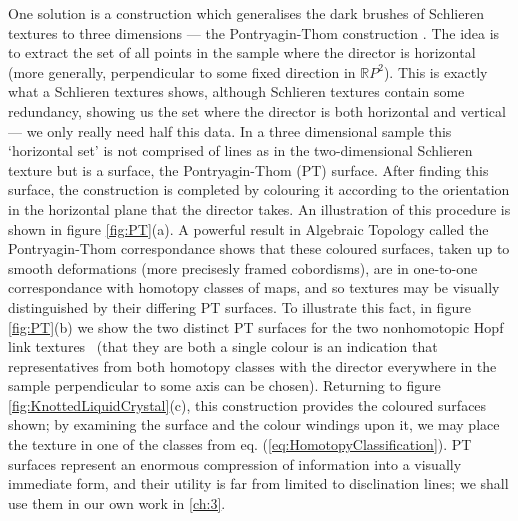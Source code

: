 One solution is a construction which generalises the dark brushes of Schlieren textures to three dimensions --- the Pontryagin-Thom construction \cite{ChenThesis, GarethBook,Machon, HopfFibrationExper}. The idea is to extract the set of all points in the sample where the director is horizontal (more generally, perpendicular to some fixed direction in $\mathbb{R}P^2$).  This is exactly what a Schlieren textures shows, although Schlieren textures contain some redundancy, showing us the set where the director is both horizontal and vertical ---  we only really need half this data. In a three dimensional sample this `horizontal set' is not comprised of lines as in the two-dimensional Schlieren texture but is a surface, the Pontryagin-Thom (PT) surface. After finding this surface, the construction is completed by colouring it according to the orientation in the horizontal plane that the director takes. An illustration of this procedure is shown in figure \ref{fig:PT}(a). A powerful result in Algebraic Topology called the Pontryagin-Thom correspondance \cite{Milnor, Hatcher} shows that these coloured surfaces, taken up to smooth deformations (more precisesly framed cobordisms), are in one-to-one correspondance with homotopy classes of maps, and so textures may be visually distinguished by their differing PT surfaces. To illustrate this fact, in figure \ref{fig:PT}(b) we show the two distinct  PT surfaces for the two nonhomotopic Hopf link textures~\cite{Machon} (that they are both a single colour is an indication that representatives from both homotopy classes with the director everywhere in the sample perpendicular to some axis can be chosen). Returning to figure \ref{fig:KnottedLiquidCrystal}(c), this construction provides the coloured surfaces shown; by examining the surface and the colour windings upon it, we may place the texture in one of the classes from eq. (\ref{eq:HomotopyClassification}). PT surfaces represent an enormous compression of information into a visually immediate form, and their utility is far from limited to disclination lines; we shall use them in our own work in \ref{ch:3}.

